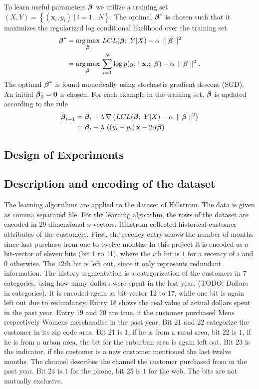 \documentclass[10pt,twocolumn,letterpaper]{article}
\begin{document}
To learn useful parameters $\boldsymbol{\beta}$ we utilize a training set $(X,Y) = \left\{ (\mathbf{x}_i,y_i)\ |\ i=1\dots N \right\}$. The optimal $\boldsymbol{\beta}^*$ is chosen such that it maximizes the regularized log conditional likelihood over the training set
\begin{align*}
\b^* &= \operatorname*{arg\,max}_{\b}\,LCL(\b;\ Y|X) - \alpha \, \parallel \b \parallel^2 \\
&= \operatorname*{arg\,max}_{\b}\,\sum_{i=1}^{N} \log p(y_i\ |\ \mathbf{x}_i;\ \b) - \alpha \, \parallel \b \parallel^2 .
\end{align*}
The optimal $\boldsymbol{\beta}^*$ is found numerically using stochastic gradient descent (SGD). An initial $\boldsymbol{\beta}_0 = \mathbf{0}$ is chosen. For each example in the training set, $\boldsymbol{\beta}$ is updated according to the rule
\begin{align*}
\boldsymbol{\beta}_{t+1} &= \boldsymbol{\beta}_{t} + \lambda \, \nabla  \left( LCL(\boldsymbol{\beta};\ Y|X) - \alpha \, \parallel  \boldsymbol{\beta} \parallel^2 \right) \\
&= \boldsymbol{\beta}_{t} + \lambda \,\left( (y_i-p_i)\, \mathbf{x}-2\alpha \boldsymbol{\beta} \right)
\end{align*}

\subsection{Design of Experiments}

\subsection{Description and encoding of the dataset}
The learning algorithms are applied to the dataset of Hillstrom. The data is given as comma separated file.
For the learning algorithm, the rows of the dataset are encoded in 29-dimensional $x$-vectors.
Hillstrom collected historical customer attributes of the customers.
First, the recency entry shows the number of months since last purchase from one to twelve months. In this project it is encoded as a bit-vector of eleven bits (bit 1 to 11), where the $i$th bit is $1$ for a recency of $i$ and $0$ otherwise. The $12$th bit is left out, since it only represents redundant information.
The history segmentation is a categorization of the customers in 7 categories, using how many dollars were spent in the last year.
(TODO: Dollars in categories). It is encoded again as bit-vector 12 to 17, while one bit is again left out due to redundancy.
Entry 18 shows the real value of actual dollars spent in the past year. Entry 19 and 20 are true, if the customer purchased Mens respectively  Womens merchandise in the past year. Bit 21 and 22 categorize the customer in its zip code area. Bit 21 is $1$, if he is from a rural area, bit 22 is $1$, if he is from a urban area, the bit for the suburban area is again left out.
Bit 23 is the indicator, if the customer is a new customer mentioned the last twelve months.
The channel describes the channel the customer purchased  from  in the past year. Bit 24 is $1$ for the phone, bit 25 is $1$ for the web. The bits are not mutually exclusive. 
\end{document}
